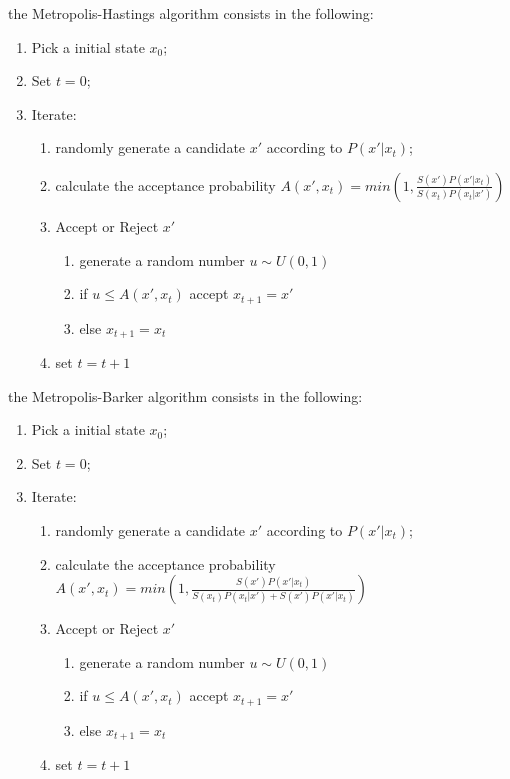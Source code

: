 \documentclass{article}
\begin{document}
the Metropolis-Hastings algorithm consists in the following:
\begin{enumerate}
 \item Pick a initial state $x_0$;
 \item Set $t = 0$;
 \item Iterate:
 \begin{enumerate}
     \item randomly generate a candidate $x'$ according to $P(x'|x_t)$;
     \item calculate the acceptance probability $A(x', x_t) = min(1, \frac{S(x')P(x'|x_t)}{S(x_t)P(x_t|x')})$
     \item Accept or Reject $x'$
     \begin{enumerate}
         \item generate a random number $u \sim U(0, 1)$
         \item if $u \leq A(x', x_t)$ accept $x_{t+1} = x'$
         \item else $x_{t+1} = x_t$
     \end{enumerate}
     \item set $t = t+1$
 \end{enumerate}
\end{enumerate}

the Metropolis-Barker algorithm consists in the following:
\begin{enumerate}
 \item Pick a initial state $x_0$;
 \item Set $t = 0$;
 \item Iterate:
 \begin{enumerate}
     \item randomly generate a candidate $x'$ according to $P(x'|x_t)$;
     \item calculate the acceptance probability $A(x', x_t) = min(1, \frac{S(x')P(x'|x_t)}{S(x_t)P(x_t|x') + S(x')P(x'|x_t)})$
     \item Accept or Reject $x'$
     \begin{enumerate}
         \item generate a random number $u \sim U(0, 1)$
         \item if $u \leq A(x', x_t)$ accept $x_{t+1} = x'$
         \item else $x_{t+1} = x_t$
     \end{enumerate}
     \item set $t = t+1$
 \end{enumerate}
\end{enumerate}
\end{document}
